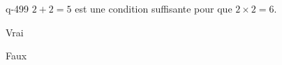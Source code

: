 \begin{truefalse}{q-499}
$2+2=5$ est une condition suffisante pour que $2\times 2=6$.
\item* Vrai
\item Faux
\end{truefalse}

